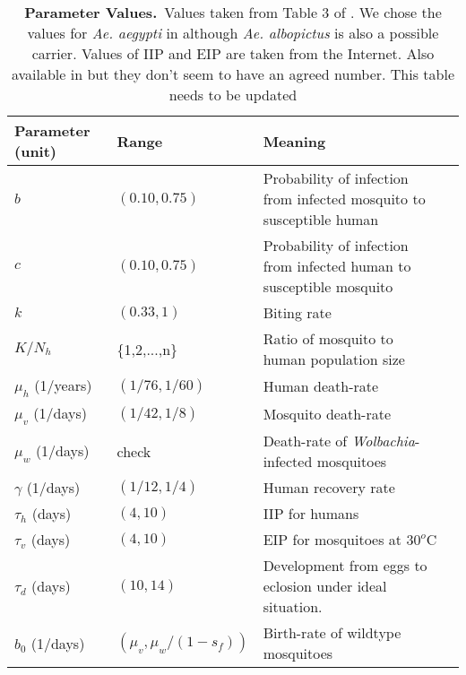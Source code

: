 \documentclass[12pt,leqno]{article}
\begin{document}
\begin{table}[!ht]
\caption{{\bf Parameter Values.} \,Values taken from Table 3 of \citep{Manore2014}. We chose
the values for \textit{Ae. aegypti} in \citep{Manore2014} although \textit{Ae. albopictus} is also a
possible carrier. Values of IIP and EIP are taken from the Internet. Also available in
\citep{Chan2012} but they don't seem to have an agreed number. {\color{red} This table needs to be updated}} 
    \begin{tabular}{ l * {3}{l}}
    \hline
    Parameter (unit) & Range &Meaning \\ \hline
    $b$ & $(0.10,0.75)$ & Probability of infection from infected mosquito to susceptible human \\ \hline
    $c$ & $(0.10,0.75)$ & Probability of infection from infected human to susceptible mosquito \\ \hline
    $k$ & $(0.33,1)$ & Biting rate \\ \hline
    $K/N_h$ & \{1,2,...,n\} & Ratio of mosquito to human population size\\ \hline
    $\mu_h$\,\,(1/years) & $(1/76,1/60)$ & Human death-rate \\ \hline
    $\mu_v$\,\,(1/days) & $(1/42,1/8)$ & Mosquito death-rate \\ \hline
		$\mu_w$\,\,(1/days) & check & Death-rate of \textit{\it Wolbachia}-infected mosquitoes \\ \hline
    $\gamma$\,\,(1/days) & $(1/12,1/4)$ & Human recovery rate \\ \hline
    $\tau_h$\,\,(days) & $(4,10)$  &IIP for humans \\ \hline
    $\tau_v$\,\,(days) & $(4,10)$  &EIP for mosquitoes at $30^o$C \\ \hline
		$\tau_d$\,\,(days) & $(10,14)$  & Development from eggs to eclosion under ideal situation.\\ \hline		
    $b_0$\,\,(1/days) & $(\mu_v,\mu_w/(1-s_f))$  & Birth-rate of wildtype mosquitoes\\ \hline
    \end{tabular}
\begin{flushleft} 
\end{flushleft}
\label{TableParameters}
\end{table}
\end{document}
